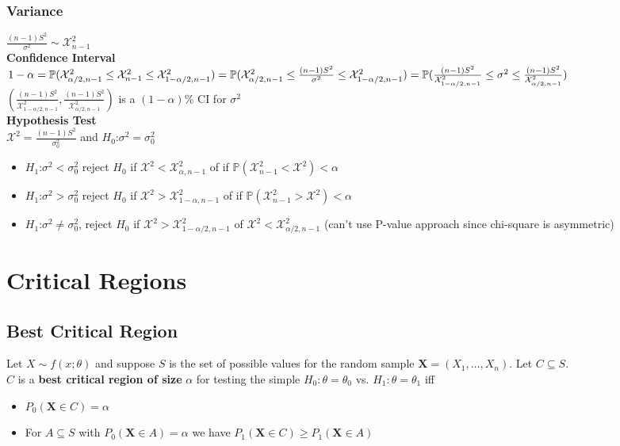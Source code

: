 \documentclass{article}
\begin{document}
\subsubsection{Variance}
\label{sec:hvar}
$\frac{(n-1)S^2}{\sigma^2}\sim\mathcal{X}^2_{n-1}$\\
\textbf{Confidence Interval}\\
$1-\alpha=\mathbb{P}(\mathcal{X}^2_{\alpha/2,n-1}\leq\mathcal{X}^2_{n-1}\leq\mathcal{X}^2_{1-\alpha/2,n-1})=\mathbb{P}(\mathcal{X}^2_{\alpha/2,n-1}\leq\frac{(n-1)S^2}{\sigma^2}\leq\mathcal{X}^2_{1-\alpha/2,n-1})\\=\mathbb{P}(\frac{(n-1)S^2}{\mathcal{X}^2_{1-\alpha/2,n-1}}\leq\sigma^2\leq\frac{(n-1)S^2}{\mathcal{X}^2_{\alpha/2,n-1}})$\\
\newline
$(\frac{(n-1)S^2}{\mathcal{X}^2_{1-\alpha/2,n-1}},\frac{(n-1)S^2}{\mathcal{X}^2_{\alpha/2,n-1}})$ is a $(1-\alpha)\%$ CI for $\sigma^2$\\
\textbf{Hypothesis Test}\\
$\mathcal{X}^2=\frac{(n-1)S^2}{\sigma^2_0}$ and $H_0$:$\sigma^2=\sigma^2_0$
\begin{itemize}
    \item $H_1$:$\sigma^2<\sigma^2_0$ reject $H_0$ if $\mathcal{X}^2<\mathcal{X}^2_{\alpha,n-1}$ of if $\mathbb{P}(\mathcal{X}^2_{n-1}<\mathcal{X}^2)<\alpha$
    \item $H_1$:$\sigma^2>\sigma^2_0$ reject $H_0$ if $\mathcal{X}^2>\mathcal{X}^2_{1-\alpha,n-1}$ of if $\mathbb{P}(\mathcal{X}^2_{n-1}>\mathcal{X}^2)<\alpha$
    \item $H_1$:$\sigma^2\neq\sigma^2_0$, reject $H_0$ if $\mathcal{X}^2>\mathcal{X}^2_{1-\alpha/2,n-1}$ of $\mathcal{X}^2<\mathcal{X}^2_{\alpha/2,n-1}$ (can't use P-value approach since chi-square is asymmetric)
\end{itemize}
\newpage
\section{Critical Regions}
\label{sec:critical}
\subsection{Best Critical Region}
Let $X\sim f(x;\theta)$ and suppose $S$ is the set of possible values for the random sample $\mathbf{X}=(X_1,\dots,X_n)$. Let $C\subseteq S$.\\
$C$ is a \textbf{best critical region of size} $\alpha$ for testing the simple $H_0:\theta=\theta_0$ vs. $H_1:\theta=\theta_1$ iff
\begin{itemize}
    \item $P_0(\mathbf{X}\in C)=\alpha$
    \item For $A\subseteq S$ with $P_0(\mathbf{X}\in A)=\alpha$ we have $P_1(\mathbf{X}\in C)\geq P_1(\mathbf{X}\in A)$
\end{itemize}
\end{document}
